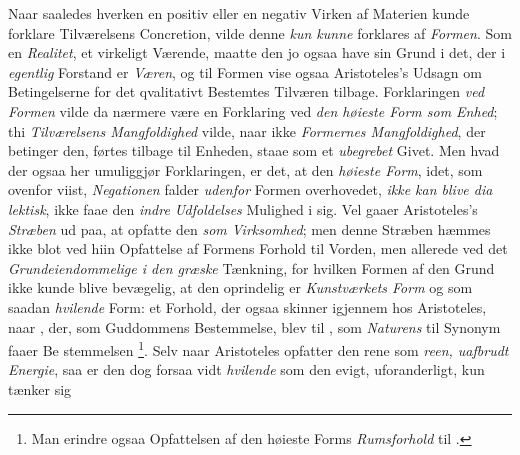 Naar saaledes hverken en positiv eller en negativ Virken
af Materien kunde forklare Tilværelsens Concretion, vilde denne
\emph{kun kunne} forklares af \emph{Formen}. Som en \emph{Realitet}, et
virkeligt Værende, maatte den jo ogsaa have sin Grund i det,
der i \emph{egentlig} Forstand er \emph{Væren}, og til Formen vise
ogsaa Aristoteles's Udsagn om Betingelserne for det qvalitativt
Bestemtes Tilværen tilbage. Forklaringen \emph{ved Formen} vilde
da nærmere være en Forklaring ved \emph{den høieste Form
som Enhed}; thi \emph{Tilværelsens Mangfoldighed} vilde,
naar ikke \emph{Formernes Mangfoldighed}, der betinger den,
førtes tilbage til Enheden, staae som et \emph{ubegrebet} Givet.
Men hvad der ogsaa her umuliggjør Forklaringen, er det, at
den \emph{høieste Form}, idet, som ovenfor viist, \emph{Negationen}
falder \emph{udenfor} Formen overhovedet, \emph{ikke kan blive dia\-%
lektisk}, ikke faae den \emph{indre Udfoldelses} Mulighed i sig.
Vel gaaer Aristoteles's \emph{Stræben} ud paa, at opfatte den
\emph{som Virksomhed}; men denne Stræben hæmmes ikke blot ved
hiin Opfattelse af Formens Forhold til Vorden, men allerede
ved det \emph{Grundeiendommelige i den græske} Tænkning,
for hvilken Formen af den Grund ikke kunde blive bevægelig,
at den oprindelig er \emph{Kunstværkets Form} og som saadan
\emph{hvilende} Form: et Forhold, der ogsaa skinner igjennem hos
Aristoteles, naar , der, som Guddommens Bestemmelse,
blev til , som \emph{Naturens}  til Synonym faaer Be\-%
stemmelsen \footnote{Man erindre ogsaa Opfattelsen af den
  høieste Forms \emph{Rumsforhold} til .}. Selv naar Aristoteles opfatter den rene
 som \emph{reen, uafbrudt Energie}, saa er den dog forsaa\-%
vidt \emph{hvilende} som den evigt, uforanderligt, kun tænker sig

